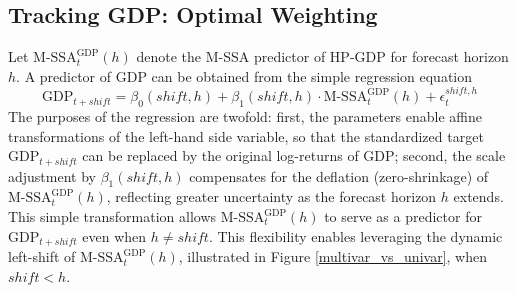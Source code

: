 \documentclass[11pt,a4paper]{article}
\begin{document}





\subsection{Tracking GDP: Optimal Weighting}

Let $\textrm{M-SSA}^{\textrm{GDP}}_t(h)$ denote the M-SSA predictor of HP-GDP for forecast horizon $h$. A predictor of GDP can be obtained from the simple regression equation
\begin{equation}
\textrm{GDP}_{t+shift}=\beta_0(shift,h)+\beta_1(shift,h) \cdot \textrm{M-SSA}^{\textrm{GDP}}_t(h) + \epsilon_t^{shift,h}
\label{eq:GDP_M-SSA}
\end{equation}
The purposes of the regression are twofold: first, the parameters enable affine transformations of the left-hand side variable, so that the standardized target $\textrm{GDP}_{t+shift}$ can be replaced by the original log-returns of GDP; second, the scale adjustment by $\beta_1(shift,h)$ compensates for the deflation (zero-shrinkage) of $\textrm{M-SSA}^{\textrm{GDP}}_t(h)$, reflecting greater uncertainty  as the forecast horizon $h$ extends. This simple transformation allows $\textrm{M-SSA}^{\textrm{GDP}}_t(h)$ to serve as a predictor for $\textrm{GDP}_{t+shift}$ even when $h\neq shift$. This flexibility enables leveraging the dynamic left-shift of $\textrm{M-SSA}^{\textrm{GDP}}_t(h)$, illustrated in Figure \ref{multivar_vs_univar}, when $shift<h$.\\
\end{document}
